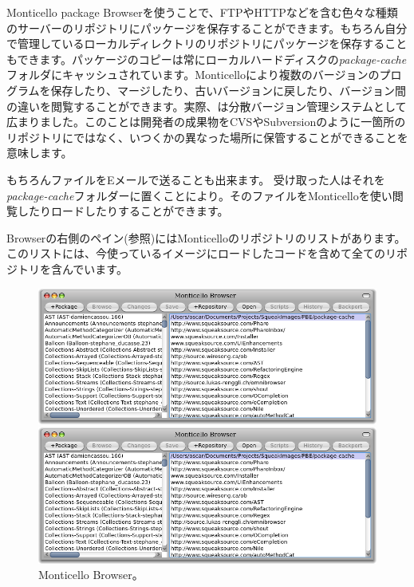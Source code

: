 \documentclass[a4paper,10pt,twoside]{book}
\begin{document}
Monticello package Browserを使うことで、FTPやHTTPなどを含む色々な種類のサーバーのリポジトリにパッケージを保存することができます。もちろん自分で管理しているローカルディレクトリのリポジトリにパッケージを保存することもできます。パッケージのコピーは常にローカルハードディスクの\emph{package-cache}フォルダにキャッシュされています。Monticelloにより複数のバージョンのプログラムを保存したり、マージしたり、古いバージョンに戻したり、バージョン間の違いを閲覧することができます。実際、は分散バージョン管理システムとして広まりました。このことは開発者の成果物をCVSやSubversionのように一箇所のリポジトリにではなく、いつくかの異なった場所に保管することができることを意味します。

もちろんファイルをEメールで送ることも出来ます。
受け取った人はそれを\emph{package-cache}フォルダーに置くことにより。そのファイルをMonticelloを使い閲覧したりロードしたりすることができます。

Browserの右側のペイン(参照)にはMonticelloのリポジトリのリストがあります。このリストには、今使っているイメージにロードしたコードを含めて全てのリポジトリを含んでいます。


\begin{figure}[hbt]
\ifluluelse
	{\centerline {\includegraphics[width=\textwidth]{MonticelloBrowser}}}
	{\centerline {\includegraphics[scale=0.7]{MonticelloBrowser}}}
\caption{Monticello Browser。
}
\end{figure}
\end{document}
